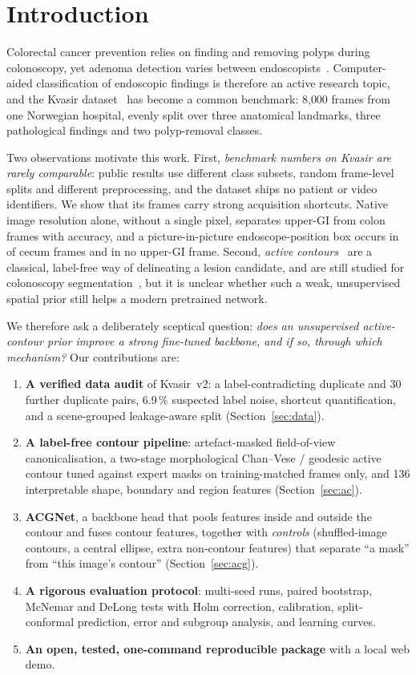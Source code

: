 \section{Introduction}
Colorectal cancer prevention relies on finding and removing polyps during colonoscopy, yet adenoma detection varies
between endoscopists~\cite{pogorelov2017kvasir}. Computer-aided classification of endoscopic findings is therefore an
active research topic, and the Kvasir dataset~\cite{pogorelov2017kvasir} has become a common benchmark: 8{,}000
frames from one Norwegian hospital, evenly split over three anatomical landmarks, three pathological findings and two
polyp-removal classes.

Two observations motivate this work. First, \emph{benchmark numbers on Kvasir are rarely comparable}: public
results use different class subsets, random frame-level splits and different preprocessing, and the dataset ships
no patient or video identifiers. We show that its frames carry strong acquisition shortcuts. Native image
resolution alone, without a single pixel, separates upper-GI from colon frames with \resOnlyAcc{} accuracy, and a
picture-in-picture endoscope-position box occurs in \tealCecum{} of cecum frames and in no upper-GI frame.
Second, \emph{active contours}~\cite{kass1988snakes,chan2001active} are a classical, label-free way of delineating
a lesion candidate, and are still studied for colonoscopy segmentation~\cite{ismail2022ways}, but it is unclear
whether such a weak, unsupervised spatial prior still helps a modern pretrained network.

We therefore ask a deliberately sceptical question: \emph{does an unsupervised active-contour prior improve
a strong fine-tuned backbone, and if so, through which mechanism?} Our contributions are:
\begin{enumerate}
\item \textbf{A verified data audit} of Kvasir~v2: a label-contradicting duplicate and 30 further duplicate pairs, 6.9\,\% suspected label noise,
 shortcut quantification, and a scene-grouped leakage-aware split (Section~\ref{sec:data}).
\item \textbf{A label-free contour pipeline}: artefact-masked field-of-view canonicalisation, a two-stage
 morphological Chan--Vese / geodesic active contour tuned against expert masks on training-matched frames only,
 and 136 interpretable shape, boundary and region features (Section~\ref{sec:ac}).
\item \textbf{ACGNet}, a backbone head that pools features inside and outside the contour and fuses contour
 features, together with \emph{controls} (shuffled-image contours, a central ellipse, extra non-contour features)
 that separate ``a mask'' from ``this image's contour'' (Section~\ref{sec:acg}).
\item \textbf{A rigorous evaluation protocol}: multi-seed runs, paired bootstrap, McNemar and DeLong tests with
 Holm correction, calibration, split-conformal prediction, error and subgroup analysis, and learning curves.
\item \textbf{An open, tested, one-command reproducible package} with a local web demo.
\end{enumerate}
